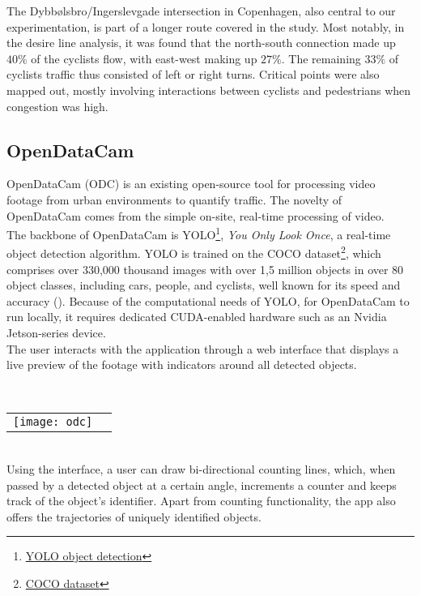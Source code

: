 The Dybbølsbro/Ingerslevgade intersection in Copenhagen, also central to our experimentation, is part of a longer route covered in the study.
Most notably, in the desire line analysis, it was found that the north-south connection made up $40\%$ of the cyclists flow, with east-west making up
$27\%$. The remaining $33\%$ of cyclists traffic thus consisted of left or right turns.
Critical points were also mapped out, mostly involving interactions between cyclists and pedestrians when congestion was high.
\ \\



\subsection{OpenDataCam}
OpenDataCam (ODC) is an existing open-source tool for processing video footage from urban environments to quantify
traffic. The novelty of OpenDataCam comes from the simple on-site, real-time processing of video. 
\ \\

The backbone of OpenDataCam is YOLO\footnote{\href{https://pjreddie.com/darknet/yolo/}{YOLO object detection}}, \textit{You Only Look Once}, a real-time object detection algorithm. 
YOLO is trained on the COCO dataset\footnote{\href{https://cocodataset.org}{COCO dataset}}, which comprises over 330,000 thousand images
with over 1,5 million objects in over 80 object classes, including cars, people, and cyclists, well known for its speed and accuracy (\cite{redmon2016look}). 
Because of the computational needs of YOLO, for OpenDataCam to run locally, it requires dedicated CUDA-enabled hardware such as an Nvidia Jetson-series device. 
\ \\

The user interacts with the application through a web interface that displays a live preview of the footage with
indicators around all detected objects.

\ \\
\raggedbottom
\noindent
\begin{tabular}{@{}cc}
\texttt{[image: odc]} 
\end{tabular}
\ \\

Using the interface, a user can draw bi-directional counting lines, which, when passed by a detected object at a certain angle, 
increments a counter and keeps track of the object's identifier. Apart from counting functionality, the app also offers the trajectories of uniquely identified objects. 

\raggedbottom